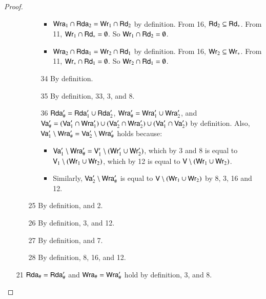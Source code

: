 \begin{proof}
\begin{itemize}
\begin{itemize}
\begin{itemize}
\begin{itemize}
    \item $\mathsf {Wra}_1 \cap \mathsf {Rda}_2 = \mathsf{Wr}_1 \cap \mathsf{Rd}_2$ by definition.
    From 16, $\mathsf{Rd}_2 \subseteq \mathsf{Rd}_*$. From 11, $\mathsf{Wr}_1 \cap \mathsf{Rd}_* = \emptyset$. So $\mathsf{Wr}_1 \cap \mathsf{Rd}_2 = \emptyset$.

    \item $\mathsf {Wra}_2 \cap \mathsf {Rda}_1 = \mathsf{Wr}_2 \cap \mathsf{Rd}_1$ by definition.
    From 16, $\mathsf{Wr}_2 \subseteq \mathsf{Wr}_*$. From 11, $\mathsf{Wr}_* \cap \mathsf{Rd}_1 = \emptyset$. So $\mathsf{Wr}_2 \cap \mathsf{Rd}_1 = \emptyset$.
    \end{itemize}
  \item[34] By definition.
  \item[35] By definition, 33, 3, and 8.
  \item[36] $\mathsf {Rda}_\#' = \mathsf {Rda}'_1 \cup \mathsf {Rda}'_2$, $\mathsf {Wra}_\#' = \mathsf {Wra}'_1 \cup \mathsf {Wra}'_2$, and $\mathsf {Va}_\#' = (\mathsf {Va}'_1 \cap \mathsf {Wra}'_1) \cup (\mathsf {Va}'_2 \cap \mathsf {Wra}'_2) \cup (\mathsf {Va}'_1 \cap \mathsf {Va}'_2)$ by definition.
%
    Also, $\mathsf {Va}'_1 \setminus \mathsf {Wra}_\#' = \mathsf {Va}'_2 \setminus \mathsf {Wra}_\#'$ holds because:
    \begin{itemize}
    \item $\mathsf {Va}'_1 \setminus \mathsf {Wra}_\#' = \mathsf{V}'_1 \setminus (\mathsf{Wr}'_1 \cup \mathsf{Wr}'_2)$, which by 3 and 8 is equal to $\mathsf{V}_1 \setminus (\mathsf{Wr}_1 \cup \mathsf{Wr}_2)$, which by 12 is equal to $\mathsf{V} \setminus (\mathsf{Wr}_1 \cup \mathsf{Wr}_2)$.
      \item Similarly, $\mathsf {Va}'_2 \setminus \mathsf {Wra}_\#'$ is equal to $\mathsf{V} \setminus (\mathsf{Wr}_1 \cup \mathsf{Wr}_2)$ by 8, 3, 16 and 12.
    \end{itemize}
  \end{itemize}
\item[25] By definition, and 2.
\item[26] By definition, 3, and 12.
\item[27] By definition, and 7.
\item[28] By definition, 8, 16, and 12.
  \end{itemize}
\item[21] $\mathsf {Rda}_\# = \mathsf {Rda}'_\#$
  and $\mathsf {Wra}_\# = \mathsf {Wra}'_\#$ hold by definition, 3, and 8.

\end{itemize}
\end{proof}

